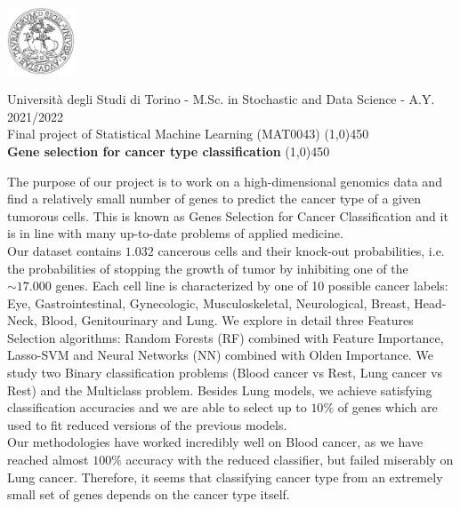 \documentclass[a4paper,11pt, oneside]{article}  %
\begin{document}
\setcounter{secnumdepth}{2}
\pagestyle{plain} %

\centerline {\includegraphics[width=2cm]{logo.jpg}}
\begin{center}
	Università degli Studi di Torino - M.Sc.  in Stochastic and Data Science - A.Y.  2021/2022 \\
	\Large { Final project of Statistical Machine Learning (MAT0043)}
	\line(1,0){450}\\ 
	\vspace{0.4cm} 
	{ \huge \textbf{Gene selection for cancer type classification} }
	\vspace{0.1cm}
	\line(1,0){450} \\
\end{center}


The purpose of our project is to work on a high-dimensional genomics data and find a relatively small number of genes to predict the cancer type of a given tumorous cells. This is known as Genes Selection for Cancer Classification and it is in line with many up-to-date problems of applied medicine. \\
Our dataset contains $1.032$ cancerous cells and their knock-out probabilities, i.e.  the probabilities of stopping the growth of tumor by inhibiting one of the $\sim 17.000$ genes.  Each cell line is characterized by one of 10 possible cancer labels: Eye, Gastrointestinal, Gynecologic, Musculoskeletal, Neurological, Breast, Head-Neck, Blood, Genitourinary and Lung.  We explore in detail three Features Selection algorithms: Random Forests (RF) combined with Feature Importance,  Lasso-SVM and Neural Networks (NN) combined with Olden Importance.  We study two Binary classification problems (Blood cancer vs Rest, Lung cancer vs Rest) and the Multiclass problem. Besides Lung models, we achieve satisfying classification accuracies and we are able to select up to $10\%$ of genes which are used to fit reduced versions of the previous models.  \\
Our methodologies have worked incredibly well on Blood cancer,  as we have reached almost $100\%$ accuracy with the reduced classifier, but failed miserably on Lung cancer. Therefore,  it seems that classifying cancer type from an extremely small set of genes depends on the cancer type itself.  
\end{document}
